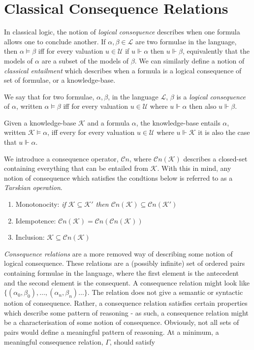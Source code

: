 \section{Classical Consequence Relations}
\label{section: consequence relations}
%
In classical logic, the notion of \emph{logical consequence} describes when one formula allows one to conclude another. If $\alpha, \beta \in \mathcal{L}$ are two formulae in the language, then $\alpha \vDash \beta$ iff for every valuation $u \in \mathcal{U}$ if $u \Vdash \alpha$ then $u \Vdash \beta$, equivalently that the models of $\alpha$ are a subset of the models of $\beta$. We can similarly define a notion of \emph{classical entailment} which describes when a formula is a logical consequence of set of formulae, or a knowledge-base.
%
\begin{definition}
    \label{definition: logical consequence}
    We say that for two formulae, $\alpha, \beta$, in the language $\mathcal{L}$, $\beta$ is a \emph{logical consequence} of $\alpha$, written $\alpha \vDash \beta$ iff for every valuation $u \in \mathcal{U}$ where $u \Vdash \alpha$ then also $u \Vdash \beta$.
\end{definition}
%
\begin{definition}
    \label{defintion: classical entailment}
    Given a knowledge-base $\mathcal{K}$ and a formula $\alpha$, the knowledge-base entails $\alpha$, written $\mathcal{K} \models \alpha$, iff every for every valuation $u \in \mathcal{U}$ where $u \Vdash \mathcal{K}$ it is also the case that $u \Vdash \alpha$.
\end{definition}
%
We introduce a consequence operator, $\mathcal{C}n$, where $\mathcal{C}n(\mathcal{K})$ describes a closed-set containing everything that can be entailed from $\mathcal{K}$. With this in mind, any notion of consequence which satisfies the condtions below is referred to as a \emph{Tarskian operation}.
\begin{enumerate}
    \item Monotonocity: \textit{if $\mathcal{K} \subseteq \mathcal{K'}$ then $\mathcal{C}n(\mathcal{K}) \subseteq \mathcal{C}n(\mathcal{K'})$}
    \item Idempotence: $\mathcal{C}n(\mathcal{K}) = \mathcal{C}n(\mathcal{C}n(\mathcal{K}))$
    \item Inclusion: $\mathcal{K} \subseteq \mathcal{C}n(\mathcal{K})$
\end{enumerate}
%
\emph{Consequence relations} are a more removed way of describing some notion of logical consequence. These relations are a (possibly infinite) set of ordered pairs containing formulae in the language, where the first element is the antecedent and the second element is the consequent. A consequence relation might look like $\{(\alpha_0, \beta_0), \ldots, (\alpha_n, \beta_n)\ldots\}$. The relation does not give a semantic or syntactic notion of consequence. Rather, a consequence relation satisfies certain properties which describe some pattern of reasoning - as such, a consequence relation might be a characterisation of some notion of consequence. Obviously, not all sets of pairs would define a meaningful pattern of reasoning. At a minimum, a meaningful consequence relation, $\Gamma$, should satisfy
